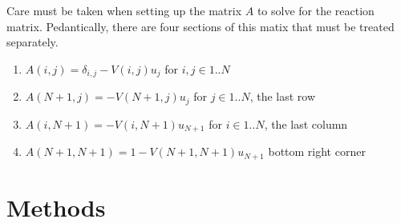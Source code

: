 \documentclass[10pt,showpacs,preprintnumbers,footinbib,amsmath,amssymb,aps,prl,twocolumn,groupedaddress,superscriptaddress,showkeys]{revtex4-1}
\begin{document}
Care must be taken when setting up the matrix $A$ to solve for the reaction
matrix. Pedantically, there are four sections of this matix that must be treated
separately.

\begin{enumerate}
	\item $A(i,j) = \delta _{i,j} - V(i,j) u_j$ for $i,j \in 1..N$
	\item $A(N+1,j) = -V(N+1,j) u_j$ for $j \in 1..N$, the last row
	\item $A(i,N+1) = -V(i,N+1) u_{N+1}$ for $i \in 1..N$, the last column
	\item $A(N+1,N+1) = 1 - V(N+1,N+1) u_{N+1}$ bottom right corner
\end{enumerate}




\section{Methods}
\end{document}
